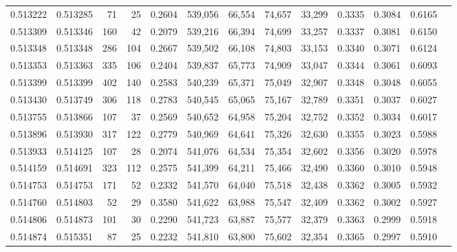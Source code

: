 \begin{tabular}{rrrrrrrrrrrrr}
0.513222 & 0.513285 &    71 &    25 &                                     0.2604 & 539,056 &  66,554 &  74,657 &  33,299 & 0.3335 & 0.3084 & 0.6165 \\
0.513309 & 0.513346 &   160 &    42 &                                     0.2079 & 539,216 &  66,394 &  74,699 &  33,257 & 0.3337 & 0.3081 & 0.6150 \\
0.513348 & 0.513348 &   286 &   104 &                                     0.2667 & 539,502 &  66,108 &  74,803 &  33,153 & 0.3340 & 0.3071 & 0.6124 \\
0.513353 & 0.513363 &   335 &   106 &                                     0.2404 & 539,837 &  65,773 &  74,909 &  33,047 & 0.3344 & 0.3061 & 0.6093 \\
0.513399 & 0.513399 &   402 &   140 &                                     0.2583 & 540,239 &  65,371 &  75,049 &  32,907 & 0.3348 & 0.3048 & 0.6055 \\
0.513430 & 0.513749 &   306 &   118 &                                     0.2783 & 540,545 &  65,065 &  75,167 &  32,789 & 0.3351 & 0.3037 & 0.6027 \\
0.513755 & 0.513866 &   107 &    37 &                                     0.2569 & 540,652 &  64,958 &  75,204 &  32,752 & 0.3352 & 0.3034 & 0.6017 \\
0.513896 & 0.513930 &   317 &   122 &                                     0.2779 & 540,969 &  64,641 &  75,326 &  32,630 & 0.3355 & 0.3023 & 0.5988 \\
0.513933 & 0.514125 &   107 &    28 &                                     0.2074 & 541,076 &  64,534 &  75,354 &  32,602 & 0.3356 & 0.3020 & 0.5978 \\
0.514159 & 0.514691 &   323 &   112 &                                     0.2575 & 541,399 &  64,211 &  75,466 &  32,490 & 0.3360 & 0.3010 & 0.5948 \\
0.514753 & 0.514753 &   171 &    52 &                                     0.2332 & 541,570 &  64,040 &  75,518 &  32,438 & 0.3362 & 0.3005 & 0.5932 \\
0.514760 & 0.514803 &    52 &    29 &                                     0.3580 & 541,622 &  63,988 &  75,547 &  32,409 & 0.3362 & 0.3002 & 0.5927 \\
0.514806 & 0.514873 &   101 &    30 &                                     0.2290 & 541,723 &  63,887 &  75,577 &  32,379 & 0.3363 & 0.2999 & 0.5918 \\
0.514874 & 0.515351 &    87 &    25 &                                     0.2232 & 541,810 &  63,800 &  75,602 &  32,354 & 0.3365 & 0.2997 & 0.5910 \\

\end{tabular}
